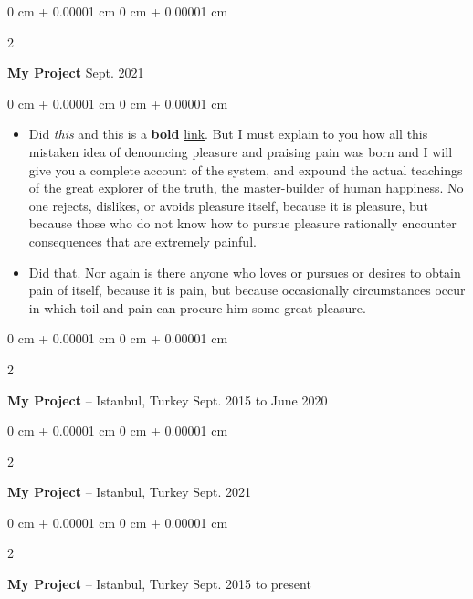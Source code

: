 \documentclass[10pt, letterpaper]{article}
\newenvironment{highlights}{
    \begin{itemize}[
        topsep=0.10 cm,
        parsep=0.10 cm,
        partopsep=0pt,
        itemsep=0pt,
        leftmargin=0 cm + 10pt
    ]
}{
    \end{itemize}
} %
\newenvironment{onecolentry}{
    \begin{adjustwidth}{
        0 cm + 0.00001 cm
    }{
        0 cm + 0.00001 cm
    }
}{
    \end{adjustwidth}
} %
\newenvironment{twocolentry}[2][]{
    \onecolentry
    \def\secondColumn{#2}
    \setcolumnwidth{\fill, 4.5 cm}
    \begin{paracol}{2}
}{
    \switchcolumn \raggedleft \secondColumn
    \end{paracol}
    \endonecolentry
} %
\begin{document}
        \vspace{0.2 cm}

        \begin{twocolentry}{
            Sept. 2021
        }
            \textbf{My Project}\end{twocolentry}

        \vspace{0.10 cm}
        \begin{onecolentry}
            \begin{highlights}
                \item Did \textit{this} and this is a \textbf{bold} \href{https://example.com}{link}. But I must explain to you how all this mistaken idea of denouncing pleasure and praising pain was born and I will give you a complete account of the system, and expound the actual teachings of the great explorer of the truth, the master-builder of human happiness. No one rejects, dislikes, or avoids pleasure itself, because it is pleasure, but because those who do not know how to pursue pleasure rationally encounter consequences that are extremely painful.
                \item Did that. Nor again is there anyone who loves or pursues or desires to obtain pain of itself, because it is pain, but because occasionally circumstances occur in which toil and pain can procure him some great pleasure.
            \end{highlights}
        \end{onecolentry}


        \vspace{0.2 cm}

        \begin{twocolentry}{
            Sept. 2015 to June 2020
        }
            \textbf{My Project} -- Istanbul, Turkey\end{twocolentry}



        \vspace{0.2 cm}

        \begin{twocolentry}{
            Sept. 2021
        }
            \textbf{My Project} -- Istanbul, Turkey\end{twocolentry}



        \vspace{0.2 cm}

        \begin{twocolentry}{
            Sept. 2015 to present
        }
            \textbf{My Project} -- Istanbul, Turkey\end{twocolentry}
\end{document}
